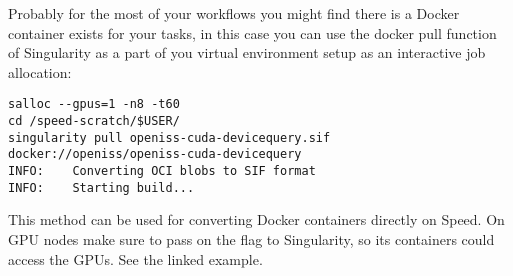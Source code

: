 Probably for the most of your workflows you might find there is a
Docker container exists for your tasks, in this case you
can use the docker pull function of Singularity as a part
of you virtual environment setup as an interactive job
allocation:

\small
\begin{verbatim}
salloc --gpus=1 -n8 -t60
cd /speed-scratch/$USER/
singularity pull openiss-cuda-devicequery.sif docker://openiss/openiss-cuda-devicequery
INFO:    Converting OCI blobs to SIF format
INFO:    Starting build...
\end{verbatim}
\normalsize

\noindent
This method can be used for converting Docker containers directly on Speed.
On GPU nodes make sure to pass on the  flag to Singularity,
so its containers could access the GPUs. See the linked example.
